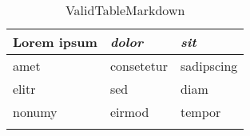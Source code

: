 ﻿\begin{longtable}[l]{|l|l|l|}
\hline
      \textbf{Lorem ipsum} 
    & \textit{\textbf{dolor}} 
    & \textit{sit} \\ \hline
      amet 
    & consetetur 
    & sadipscing \\ \hline
      elitr 
    & sed 
    & diam \\ \hline
      nonumy 
    & eirmod 
    & tempor \\ \hline
\caption{ValidTableMarkdown}
\label{tab:validtablemarkdown}
\end{longtable}